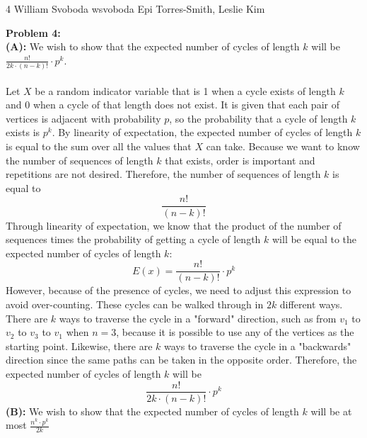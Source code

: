 \documentclass[12pt,letterpaper]{cos340hw}
\begin{document}
           {4}            %
           {William Svoboda}  %
           {wsvoboda}   %
           {Epi Torres-Smith, Leslie Kim} 




\noindent\textbf{Problem 4:}\\
\noindent\textbf{(A):} We wish to show that the expected number of cycles of length $k$ will be 
$\frac{n!}{2k \cdot (n-k)!} \cdot p^k$.\\\\
Let $X$ be a random indicator variable that is 1 when a cycle exists of length $k$ and 0 when a cycle of that 
length does not exist. It is given that each pair of vertices is adjacent with probability $p$, so the probability that 
a cycle of length $k$ exists is $p^k$. By linearity of expectation, the expected number of cycles of length $k$ is equal 
to the sum over all the values that $X$ can take. Because we want to know the number of sequences of length $k$ that 
exists, order is important and repetitions are not desired. Therefore, the number of sequences of length $k$ is equal to 
$$\frac{n!}{(n-k)!}$$
Through linearity of expectation, we know that the product of the number of sequences times the probability of getting 
a cycle of length $k$ will be equal to the expected number of cycles of length $k$:
$$E(x)=\frac{n!}{(n-k)!} \cdot p^k$$
However, because of the presence of cycles, we need to adjust this expression to avoid over-counting.
These cycles can be walked through in $2k$ different ways. There are $k$ ways to traverse the cycle in a "forward" direction, 
such as from $v_1$ to $v_2$ to $v_3$ to $v_1$ when $n=3$, because it is possible to use any of the vertices as the starting 
point. Likewise, there are $k$ ways to traverse the cycle in a "backwards" direction since the same paths can be taken 
in the opposite order. Therefore, the expected number of cycles of length $k$ will be 
$$\frac{n!}{2k \cdot (n-k)!} \cdot p^k$$
\noindent\textbf{(B):} We wish to show that the expected number of cycles of length $k$ will be at most 
$\frac{n^k \cdot p^k}{2k}$\\\\
\end{document}
